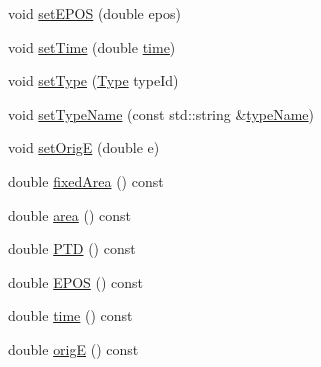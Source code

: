 \begin{DoxyCompactItemize}
void \hyperlink{classAnalysis_1_1FastJet_1_1CaloSignalInfo_a5e765abf01922d438c57d917d4ed4c73}{set\+E\+P\+OS} (double epos)
\item 
void \hyperlink{classAnalysis_1_1FastJet_1_1CaloSignalInfo_a187b575d702f519644f2182217967b75}{set\+Time} (double \hyperlink{classAnalysis_1_1FastJet_1_1CaloSignalInfo_a74925b32feb684ee5c4629f126519be7}{time})
\item 
void \hyperlink{classAnalysis_1_1FastJet_1_1CaloSignalInfo_a1690e94963b3c31c00dcfbdc8aba7067}{set\+Type} (\hyperlink{classAnalysis_1_1FastJet_1_1CaloSignalInfo_ac03e8f6d7fb631eab49a9ab02cda7675}{Type} type\+Id)
\item 
void \hyperlink{classAnalysis_1_1FastJet_1_1CaloSignalInfo_a41827f5221f07e060ce86d0fd82ddda5}{set\+Type\+Name} (const std\+::string \&\hyperlink{classAnalysis_1_1FastJet_1_1CaloSignalInfo_acc8335b43ac3e8cc2cc040c230b50aa3}{type\+Name})
\item 
void \hyperlink{classAnalysis_1_1FastJet_1_1CaloSignalInfo_a273f8e95a73022aa25565216a4508852}{set\+OrigE} (double e)
\item 
double \hyperlink{classAnalysis_1_1FastJet_1_1CaloSignalInfo_a6c825d60c49876434ca6d5535c8e24e2}{fixed\+Area} () const 
\item 
double \hyperlink{classAnalysis_1_1FastJet_1_1CaloSignalInfo_a4998572743794def4adae57cf3865a2c}{area} () const 
\item 
double \hyperlink{classAnalysis_1_1FastJet_1_1CaloSignalInfo_ae7a8771287aac7e9f3de29768f21fb0d}{P\+TD} () const 
\item 
double \hyperlink{classAnalysis_1_1FastJet_1_1CaloSignalInfo_ad0af2ed179c09d0adf74331e9a4a6e08}{E\+P\+OS} () const 
\item 
double \hyperlink{classAnalysis_1_1FastJet_1_1CaloSignalInfo_a74925b32feb684ee5c4629f126519be7}{time} () const 
\item 
double \hyperlink{classAnalysis_1_1FastJet_1_1CaloSignalInfo_a04cfca843c49a95befabfa6b1dcdc9b3}{origE} () const 
\end{DoxyCompactItemize}
